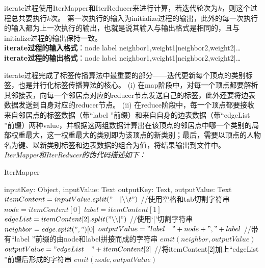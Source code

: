 iterate过程使用IterMapper和IterReducer来进行计算，若迭代轮次为$k$，则这个过程总共要执行$k$次。
第一次执行的输入为initialize过程的输出，此外的每一次执行的输入都为上一次执行的输出，也就是说其输入与输出格式是相同的，且与initialize过程的输出保持一致。
\\ \textbf{iterate过程的输入格式}：node  label neighbor1,weight1|neighbor2,weight2|\dots
\\ \textbf{iterate过程的输出格式}：node  label neighbor1,weight1|neighbor2,weight2|\dots
\par
iterate过程完成了标签传播算法中最重要的部分——迭代更新每个顶点的类别标签，也是并行化标签传播算法的核心。
(i) 在map阶段中，对每一个顶点都要解析其邻接表，向每一个邻居点对应的reducer节点发送自己的标签，此外还要将边表数据发送到自身对应的reducer节点。
(ii) 在reduce阶段中，每一个顶点都要接收来自邻居点的标签数据（带“label ”前缀）和来自自身的边表数据（带“edgeList ”前缀）两种value，并根据这两组数据计算出在该顶点的邻居点中哪一个类别的局部权重最大，这一权重最大的类别即为该顶点的新类别；最后，需要以顶点的人物名为键、以新类别标签和边表数据的组合为值，将结果输出到文件中。
\\
\emph{IterMapper和IterReducer的伪代码描述如下：}
\begin{algorithm}[H]
    \caption{IterMapper}
    \begin{algorithmic}[1]
        \REQUIRE inputKey: Object, inputValue: Text
        \ENSURE outputKey: Text, outputValue: Text
        \STATE $itemContent = inputValue.split("\quad |\backslash\backslash t")$ //使用空格和tab切割字符串
        \STATE $node = itemContent[0]$
        \STATE $label = itemContent[1]$
        \STATE $edgeList = itemContent[2].split("\backslash\backslash|")$ //使用‘|’切割字符串
        \STATE $neighbor = edge.split(",")[0]$
        \STATE $outputValue = "label\quad" + node + "," + label$ //带有“label ”前缀的由node和label拼接而成的字符串
        \STATE $emit(neighbor, outputValue)$
        \ENDFOR
        \STATE $outputValue = "edgeList\quad" + itemContent[2]$ //将itemContent[2]加上“edgeList ”前缀后形成的字符串
        \STATE $emit(node, outputValue)$
    \end{algorithmic}
\end{algorithm}
